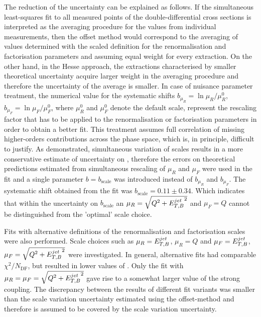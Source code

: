The reduction of the \asz uncertainty can be explained as follows. If the simultaneous least-squares fit to all measured points of the double-differential cross sections is interpreted as the averaging procedure for the \asz values from individual measurements, then the offset method would correspond to the averaging of \asz values determined with the scaled definition for the renormalisation and factorisation parameters and assuming equal weight for every extraction. On the other hand, in the Hesse approach, the extractions characterised by smaller theoretical uncertainty acquire larger weight in the averaging procedure and therefore the uncertainty of the average \asz is smaller. In case of nuisance parameter treatment, the numerical value for the systematic shifts $b_{\mu_R}=\ln{\mu_R/\mu_R^0}$, $b_{\mu_F}=\ln{\mu_F/\mu_F^0}$, where $\mu_R^0$ and $\mu_F^0$ denote the default scale, represent the rescaling factor that has to be applied to the renormalisation or factorisation parameters in order to obtain a better fit. This treatment assumes full correlation of missing higher-orders contributions across the phase space, which is, in principle, difficult to justify. As demonstrated, simultaneous variation of scales results in a more conservative estimate of uncertainty on \as, therefore the errors on theoretical predictions estimated from simultaneous rescaling of $\mu_R$ and $\mu_F$ were used in the fit and a single parameter $b=b_\text{scale}$ was introduced instead of $b_{\mu_R}$ and $b_{\mu_F}$. The systematic shift obtained from the fit was $b_\text{scale}=0.11\pm 0.34$. Which indicates that within the uncertainty on $b_\text{scale}$ an $\mu_R=\sqrt{\mbox{${Q^2}$}+\mbox{$E_{T,B}^{jet}$}^2}$ and $\mu_F=Q$ cannot be distinguished from the 'optimal' scale choice.

Fits with alternative definitions of the renormalisation and factorisation scales were also performed. Scale choices such as $\mu_R=\mbox{$E_{T,B}^{jet}$}$, $\mu_R=Q$ and $\mu_F=\mbox{$E_{T,B}^{jet}$}$, $\mu_F=\sqrt{\mbox{${Q^2}$}+\mbox{$E_{T,B}^{jet}$}^2}$ were investigated. In general, alternative fits had comparable $\chi^2/N_\text{DF}$, but resulted in lower values of \asz. Only the fit with $\mu_R=\mu_F=\sqrt{\mbox{${Q^2}$}+\mbox{$E_{T,B}^{jet}$}^2}$ gave rise to a somewhat larger value of the strong coupling. The discrepancy between the results of different fit variants was smaller than the scale variation uncertainty estimated using the offset-method and therefore is assumed to be covered by the scale variation uncertainty.

